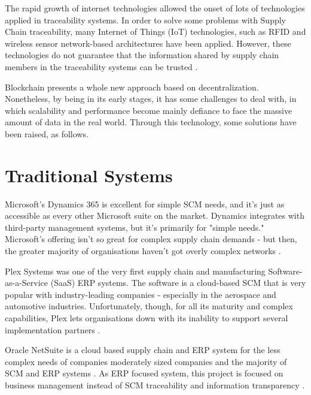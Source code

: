 \label{chap:RelatedWork}

\acresetall 

The rapid growth of internet technologies allowed the onset of lots of technologies applied in traceability systems. In order to solve some problems with Supply Chain traceability, many Internet of Things (IoT) technologies, such as RFID and wireless sensor network-based architectures have been applied. However, these technologies do not guarantee that the information shared by supply chain members in the traceability systems can be trusted \cite{tian2017supply}.

Blockchain presents a whole new approach based on decentralization. Nonetheless, by being in its early stages, it has some challenges to deal with, in which scalability and performance become mainly defiance to face the massive amount of data in the real world. Through this technology, some solutions have been raised, as follows.

\section{Traditional Systems} \label{sec:TraditionalSystems}

Microsoft's Dynamics 365 is excellent for simple SCM needs, and it's just as accessible as every other Microsoft suite on the market. Dynamics integrates with third-party management systems, but it's primarily for "simple needs." Microsoft's offering isn't so great for complex supply chain demands - but then, the greater majority of organisations haven't got overly complex networks \cite{bellu2018microsoft}.

Plex Systems was one of the very first supply chain and manufacturing Software-as-a-Service (SaaS) ERP systems. The software is a cloud-based SCM that is very popular with industry-leading companies - especially in the aerospace and automotive industries. Unfortunately, though, for all its maturity and complex capabilities, Plex lets organisations down with its inability to support several implementation partners \cite{plex}.

Oracle NetSuite is a cloud based supply chain and ERP system for the less complex needs of companies moderately sized companies and the majority of SCM and ERP systems \cite{rolling2016using}. As ERP focused system, this project is focused on business management instead of SCM traceability and information transparency \cite{rolling2016using}.

